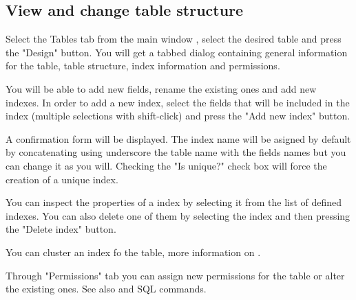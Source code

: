 \subsection{View and change table structure}
Select the Tables tab from the main window , select the desired table and press the "Design" button. You will get a tabbed dialog containing general information for the table, table structure, index information and permissions.
   
You will be able to add new fields, rename the existing ones and add new indexes. In order to add a new index, select the fields that will be included in the index (multiple selections with shift-click) and press the "Add new index" button.
   
A confirmation form will be displayed. The index name will be asigned by default by concatenating using underscore the table name with the fields names but you can change it as you will. Checking the "Is unique?" check box will force the creation of a unique index.
  
You can inspect the properties of a index by selecting it from the list of defined indexes. You can also delete one of them by selecting the index and then pressing the "Delete index" button.

You can cluster an index fo the table, more information on .

Through "Permissions" tab you can assign new permissions for the table or alter the existing ones. See also  and  SQL commands.
